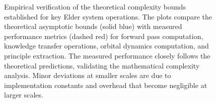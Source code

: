 \begin{figure}[h]
\caption{Empirical verification of the theoretical complexity bounds established for key Elder system operations. The plots compare the theoretical asymptotic bounds (solid blue) with measured performance metrics (dashed red) for forward pass computation, knowledge transfer operations, orbital dynamics computation, and principle extraction. The measured performance closely follows the theoretical predictions, validating the mathematical complexity analysis. Minor deviations at smaller scales are due to implementation constants and overhead that become negligible at larger scales.}
\label{fig:empirical_verification}
\end{figure}